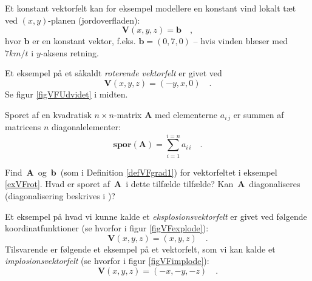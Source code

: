 \begin{example} \label{exVFkonstant}
Et konstant vektorfelt kan for eksempel modellere en konstant vind lokalt tæt
ved $(x,y)$-planen (jord\-over\-fla\-den):
\begin{equation}
{\mathbf{V}}(x,y,z) = {\mathbf{b}} \quad ,
\end{equation}
hvor ${\mathbf{b}}$ er en konstant vektor, f.eks. ${\mathbf{b}} = (0, 7,
0)$  -- hvis vinden blæser med $7 km/t$ i $y$-aksens retning.
\end{example}


\begin{example} \label{exVFrot}
Et eksempel på et såkaldt {\emph{roterende vektorfelt}} er givet ved
\begin{equation}
{\mathbf{V}}(x,y,z) = (-y, x, 0) \quad .
\end{equation}
Se figur \ref{figVFUdvidet} i midten.
\end{example}


\begin{definition} \label{defSpor}
Sporet af en kvadratisk $n \times n$-matrix $\bm{A}$ med elementerne $a_{i\,j}$ er summen af matricens $n$ diagonalelementer:
\begin{equation}
\textbf{spor}(\bm{A}) = \sum_{i=1}^{i=n} a_{i\,i} \quad .
\end{equation}
\end{definition}


\begin{exercise}\label{exerVFrot}
Find ${\,\mathbf{A}\,}$ og $\,{\mathbf{b}}\,$ (som i Definition \ref{defVFgrad1}) for vektorfeltet i
eksempel  \ref{exVFrot}. Hvad er sporet af ${\,\mathbf{A}\,}$ i dette tilfælde tilfælde? Kan ${\,\mathbf{A}\,}$ diagonaliseres (diagonalisering beskrives i )?
\end{exercise}


\begin{example} \label{exVFexplode}
Et eksempel på hvad vi kunne kalde et {\emph{eksplosionsvektorfelt}} er givet
ved følgende koordinatfunktioner (se hvorfor i figur \ref{figVFexplode}):
\begin{equation}
{\mathbf{V}}(x,y,z) = (x, y, z) \quad .
\end{equation}
Tilsvarende er følgende et eksempel på et vektorfelt, som vi kan kalde et \emph{implosionsvektorfelt} (se hvorfor i figur \ref{figVFimplode}):
\begin{equation}
{\mathbf{V}}(x,y,z) = (-x, -y, -z) \quad .
\end{equation}
\end{example}

